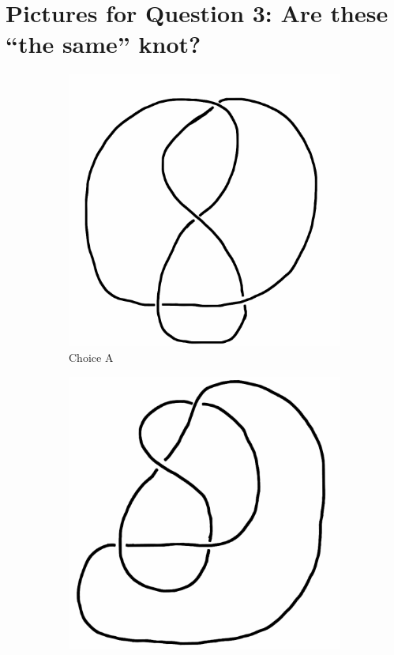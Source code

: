 \documentclass[12pt,letterpaper]{article}
\theoremstyle{definition}
\begin{document}
\clearpage

\section*{Pictures for Question 3: Are these ``the same'' knot?}

\begin{figure}[h!]
    \begin{subfigure}[b]{0.4\textwidth}
        \includegraphics[width=\textwidth]{meeting06pics/9SeptQ3a.png}
        \caption{Choice A}
    \end{subfigure}
    \hspace{2cm}
    \begin{subfigure}[b]{0.4\textwidth}
        \includegraphics[width=\textwidth]{meeting06pics/9SeptQ3b.png}

\end{subfigure}
\end{figure}
\end{document}
